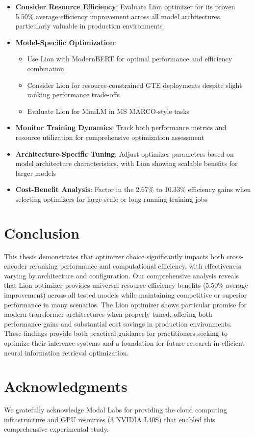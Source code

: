 \begin{itemize}
    \item \textbf{Consider Resource Efficiency}: Evaluate Lion optimizer for its proven 5.50\% average efficiency improvement across all model architectures, particularly valuable in production environments
    \item \textbf{Model-Specific Optimization}: 
    \begin{itemize}
        \item Use Lion with ModernBERT for optimal performance and efficiency combination
        \item Consider Lion for resource-constrained GTE deployments despite slight ranking performance trade-offs
        \item Evaluate Lion for MiniLM in MS MARCO-style tasks
    \end{itemize}
    \item \textbf{Monitor Training Dynamics}: Track both performance metrics and resource utilization for comprehensive optimization assessment
    \item \textbf{Architecture-Specific Tuning}: Adjust optimizer parameters based on model architecture characteristics, with Lion showing scalable benefits for larger models
    \item \textbf{Cost-Benefit Analysis}: Factor in the 2.67\% to 10.33\% efficiency gains when selecting optimizers for large-scale or long-running training jobs
\end{itemize}

\section{Conclusion}

This thesis demonstrates that optimizer choice significantly impacts both cross-encoder reranking performance and computational efficiency, with effectiveness varying by architecture and configuration. Our comprehensive analysis reveals that Lion optimizer provides universal resource efficiency benefits (5.50\% average improvement) across all tested models while maintaining competitive or superior performance in many scenarios. The Lion optimizer shows particular promise for modern transformer architectures when properly tuned, offering both performance gains and substantial cost savings in production environments. These findings provide both practical guidance for practitioners seeking to optimize their inference systems and a foundation for future research in efficient neural information retrieval optimization.

\section*{Acknowledgments}

We gratefully acknowledge Modal Labs for providing the cloud computing infrastructure and GPU resources (3 NVIDIA L40S) that enabled this comprehensive experimental study.